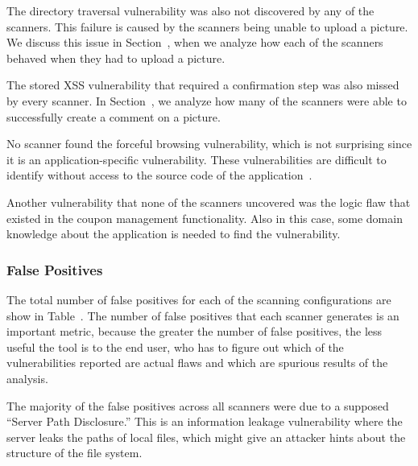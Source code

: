 The directory traversal vulnerability was also not discovered by any of the
scanners. This failure is caused by the scanners being unable to
upload a picture. We
discuss this issue in Section~, when we analyze how each of the
scanners behaved when they had to upload a picture.

The stored XSS vulnerability that required a confirmation step was also missed
by every scanner. In Section~, we analyze how many of
the scanners were able to successfully create a comment on a picture.

No scanner found the forceful browsing vulnerability, which is not 
surprising since it is an application-specific
vulnerability. These vulnerabilities are difficult to identify
without access to the source code of the application~\cite{balzarotti07:mimosa}.

Another vulnerability that none of the scanners uncovered was the
logic flaw that existed in the coupon management functionality. 
Also in this case, some domain knowledge about the application is needed to
find the vulnerability.





\subsubsection{False Positives}

The total number of false positives for each of the scanning
configurations are show in Table~.
The number 
of false positives that each scanner generates is an important metric, because
the greater the number of false positives, the less useful the tool is to the
end user, who has to figure out which of the vulnerabilities reported are actual
flaws and which are spurious results of the analysis. 

The majority of the false positives across all scanners were due to a supposed
``Server Path Disclosure.'' This is an information leakage vulnerability where
the server leaks the paths of local files, which might give an attacker 
hints about the structure of the file system.

